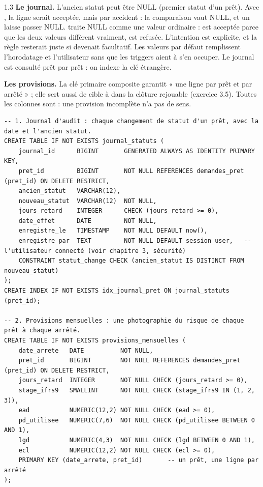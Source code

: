 \begin{correction}{1.3}
\textbf{Le journal.} L'ancien statut peut être NULL (premier statut d'un prêt). Avec
, la ligne  serait acceptée,
mais par accident : la comparaison vaut NULL, et un  laisse passer NULL.
 traite NULL comme une valeur ordinaire :  est acceptée
parce que les deux valeurs diffèrent vraiment,  est refusée. L'intention est
explicite, et la règle resterait juste si  devenait facultatif. Les valeurs par
défaut remplissent l'horodatage et l'utilisateur sans que les triggers aient à s'en occuper. Le journal
est consulté prêt par prêt : on indexe la clé étrangère.

\textbf{Les provisions.} La clé primaire composite  garantit « une ligne par
prêt et par arrêté » ; elle sert aussi de cible à  dans la clôture rejouable
(exercice 3.5). Toutes les colonnes sont  : une provision incomplète n'a pas de sens.

\begin{lstlisting}[style=long]
-- 1. Journal d'audit : chaque changement de statut d'un prêt, avec la date et l'ancien statut.
CREATE TABLE IF NOT EXISTS journal_statuts (
    journal_id      BIGINT       GENERATED ALWAYS AS IDENTITY PRIMARY KEY,
    pret_id         BIGINT       NOT NULL REFERENCES demandes_pret (pret_id) ON DELETE RESTRICT,
    ancien_statut   VARCHAR(12),
    nouveau_statut  VARCHAR(12)  NOT NULL,
    jours_retard    INTEGER      CHECK (jours_retard >= 0),
    date_effet      DATE         NOT NULL,
    enregistre_le   TIMESTAMP    NOT NULL DEFAULT now(),
    enregistre_par  TEXT         NOT NULL DEFAULT session_user,   -- l'utilisateur connecté (voir chapitre 3, sécurité)
    CONSTRAINT statut_change CHECK (ancien_statut IS DISTINCT FROM nouveau_statut)
);
CREATE INDEX IF NOT EXISTS idx_journal_pret ON journal_statuts (pret_id);

-- 2. Provisions mensuelles : une photographie du risque de chaque prêt à chaque arrêté.
CREATE TABLE IF NOT EXISTS provisions_mensuelles (
    date_arrete   DATE          NOT NULL,
    pret_id       BIGINT        NOT NULL REFERENCES demandes_pret (pret_id) ON DELETE RESTRICT,
    jours_retard  INTEGER       NOT NULL CHECK (jours_retard >= 0),
    stage_ifrs9   SMALLINT      NOT NULL CHECK (stage_ifrs9 IN (1, 2, 3)),
    ead           NUMERIC(12,2) NOT NULL CHECK (ead >= 0),
    pd_utilisee   NUMERIC(7,6)  NOT NULL CHECK (pd_utilisee BETWEEN 0 AND 1),
    lgd           NUMERIC(4,3)  NOT NULL CHECK (lgd BETWEEN 0 AND 1),
    ecl           NUMERIC(12,2) NOT NULL CHECK (ecl >= 0),
    PRIMARY KEY (date_arrete, pret_id)       -- un prêt, une ligne par arrêté
);
\end{lstlisting}


\end{correction}
